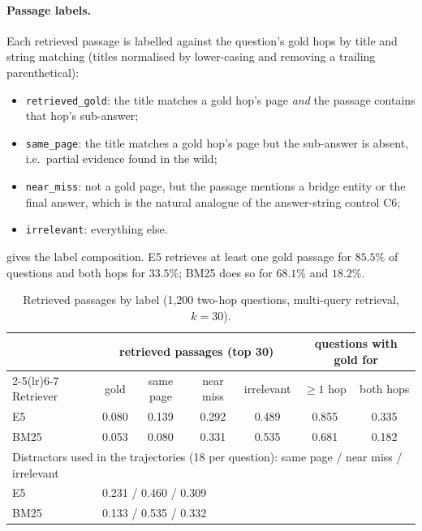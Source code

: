 \paragraph{Passage labels.} Each retrieved passage is labelled against the question's gold hops by title and string matching (titles normalised by lower-casing and removing a trailing parenthetical):
\begin{itemize}
  \item \texttt{retrieved\_gold}: the title matches a gold hop's page \emph{and} the passage contains that hop's sub-answer;
  \item \texttt{same\_page}: the title matches a gold hop's page but the sub-answer is absent, i.e.\ partial evidence found in the wild;
  \item \texttt{near\_miss}: not a gold page, but the passage mentions a bridge entity or the final answer, which is the natural analogue of the answer-string control C6;
  \item \texttt{irrelevant}: everything else.
\end{itemize}
 gives the label composition. E5 retrieves at least one gold passage for $85.5\%$ of questions and both hops for $33.5\%$; BM25 does so for $68.1\%$ and $18.2\%$.

\begin{table}[h]
\centering\small
\begin{tabular}{lcccccc}
\toprule
& \multicolumn{4}{c}{retrieved passages (top 30)} & \multicolumn{2}{c}{questions with gold for} \\
\cmidrule(lr){2-5}\cmidrule(lr){6-7}
Retriever & gold & same page & near miss & irrelevant & $\ge1$ hop & both hops \\
\midrule
E5 & 0.080 & 0.139 & 0.292 & 0.489 & 0.855 & 0.335 \\
BM25 & 0.053 & 0.080 & 0.331 & 0.535 & 0.681 & 0.182 \\
\midrule
\multicolumn{7}{l}{Distractors used in the trajectories (18 per question): same page / near miss / irrelevant} \\
E5 & \multicolumn{6}{l}{0.231 / 0.460 / 0.309} \\
BM25 & \multicolumn{6}{l}{0.133 / 0.535 / 0.332} \\
\bottomrule
\end{tabular}
\caption{Retrieved passages by label (1{,}200 \musique{} two-hop questions, multi-query retrieval, $k=30$).}
\label{tab:estb-retrieval}
\end{table}

